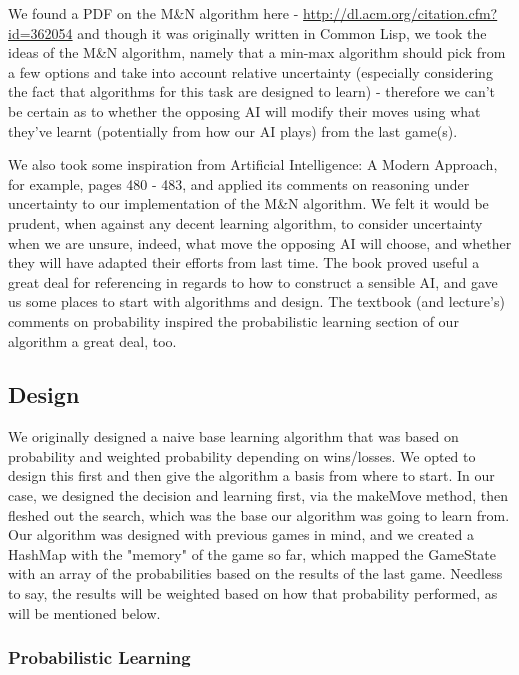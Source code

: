 \documentclass[11pt]{article}
\begin{document}
We found a PDF on the M\&N algorithm here - \url{http://dl.acm.org/citation.cfm?id=362054} and though it was originally written in Common Lisp, we took the ideas of the M\&N algorithm, namely that a min-max algorithm should pick from a few options and take into account relative uncertainty (especially considering the fact that algorithms for this task are designed to learn) - therefore we can't be certain as to whether the opposing AI will modify their moves using what they've learnt (potentially from how our AI plays) from the last game(s).

We also took some inspiration from Artificial Intelligence: A Modern Approach, for example, pages 480 - 483, and applied its comments on reasoning under uncertainty to our implementation of the M\&N algorithm. We felt it would be prudent, when against any decent learning algorithm, to consider uncertainty when we are unsure, indeed, what move the opposing AI will choose, and whether they will have adapted their efforts from last time. The book proved useful a great deal for referencing in regards to how to construct a sensible AI, and gave us some places to start with algorithms and design. The textbook (and lecture's) comments on probability inspired the probabilistic learning section of our algorithm a great deal, too.
\subsection{Design}
\label{sec-3-2}

We originally designed a naive base learning algorithm that was based on probability and weighted probability depending on wins/losses. We opted to design this first and then give the algorithm a basis from where to start. In our case, we designed the decision and learning first, via the makeMove method, then fleshed out the search, which was the base our algorithm was going to learn from. Our algorithm was designed with previous games in mind, and we created a HashMap with the "memory" of the game so far, which mapped the GameState with an array of the probabilities based on the results of the last game. Needless to say, the results will be weighted based on how that probability performed, as will be mentioned below.

\subsubsection{Probabilistic Learning}
\label{sec-3-2-1}
\end{document}
